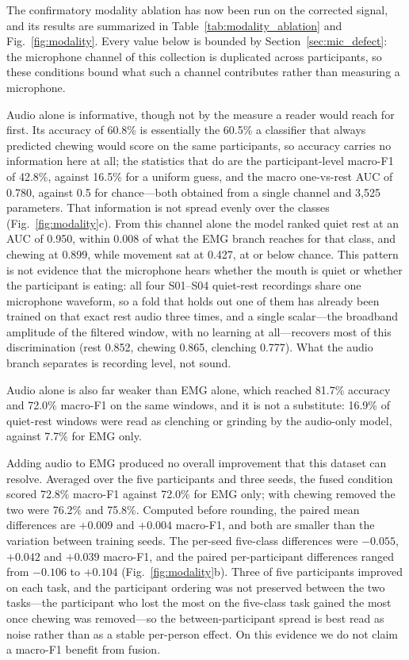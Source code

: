 \documentclass[pdflatex,sn-nature,iicol]{sn-jnl}
\begin{document}
The confirmatory modality ablation has now been run on the corrected signal, and its results are summarized in Table~\ref{tab:modality_ablation} and Fig.~\ref{fig:modality}. Every value below is bounded by Section~\ref{sec:mic_defect}: the microphone channel of this collection is duplicated across participants, so these conditions bound what such a channel contributes rather than measuring a microphone.

Audio alone is informative, though not by the measure a reader would reach for first. Its accuracy of 60.8\% is essentially the 60.5\% a classifier that always predicted chewing would score on the same participants, so accuracy carries no information here at all; the statistics that do are the participant-level macro-F1 of 42.8\%, against 16.5\% for a uniform guess, and the macro one-vs-rest AUC of 0.780, against 0.5 for chance---both obtained from a single channel and 3,525 parameters. That information is not spread evenly over the classes (Fig.~\ref{fig:modality}c). From this channel alone the model ranked quiet rest at an AUC of 0.950, within 0.008 of what the EMG branch reaches for that class, and chewing at 0.899, while movement sat at 0.427, at or below chance. This pattern is not evidence that the microphone hears whether the mouth is quiet or whether the participant is eating: all four S01--S04 quiet-rest recordings share one microphone waveform, so a fold that holds out one of them has already been trained on that exact rest audio three times, and a single scalar---the broadband amplitude of the filtered window, with no learning at all---recovers most of this discrimination (rest 0.852, chewing 0.865, clenching 0.777). What the audio branch separates is recording level, not sound.

Audio alone is also far weaker than EMG alone, which reached 81.7\% accuracy and 72.0\% macro-F1 on the same windows, and it is not a substitute: 16.9\% of quiet-rest windows were read as clenching or grinding by the audio-only model, against 7.7\% for EMG only.

Adding audio to EMG produced no overall improvement that this dataset can resolve. Averaged over the five participants and three seeds, the fused condition scored 72.8\% macro-F1 against 72.0\% for EMG only; with chewing removed the two were 76.2\% and 75.8\%. Computed before rounding, the paired mean differences are $+0.009$ and $+0.004$ macro-F1, and both are smaller than the variation between training seeds. The per-seed five-class differences were $-0.055$, $+0.042$ and $+0.039$ macro-F1, and the paired per-participant differences ranged from $-0.106$ to $+0.104$ (Fig.~\ref{fig:modality}b). Three of five participants improved on each task, and the participant ordering was not preserved between the two tasks---the participant who lost the most on the five-class task gained the most once chewing was removed---so the between-participant spread is best read as noise rather than as a stable per-person effect. On this evidence we do not claim a macro-F1 benefit from fusion.
\end{document}
